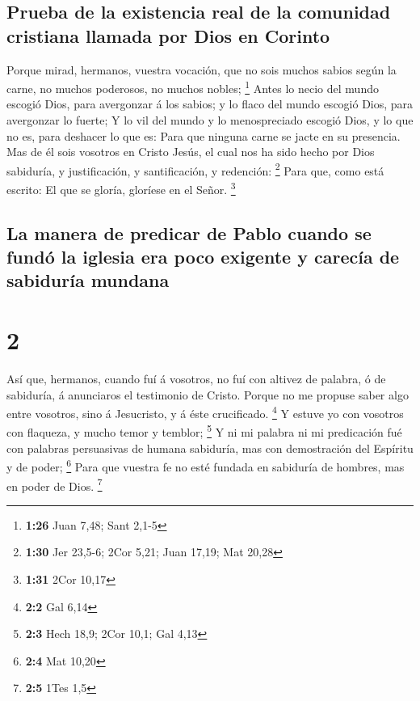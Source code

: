 \hypertarget{prueba-de-la-existencia-real-de-la-comunidad-cristiana-llamada-por-dios-en-corinto}{%
\subsection{Prueba de la existencia real de la comunidad cristiana
llamada por Dios en
Corinto}\label{prueba-de-la-existencia-real-de-la-comunidad-cristiana-llamada-por-dios-en-corinto}}

 Porque mirad, hermanos, vuestra vocación, que no sois
muchos sabios según la carne, no muchos poderosos, no muchos nobles;
\footnote{\textbf{1:26} Juan 7,48; Sant 2,1-5}  Antes lo
necio del mundo escogió Dios, para avergonzar á los sabios; y lo flaco
del mundo escogió Dios, para avergonzar lo fuerte;  Y lo
vil del mundo y lo menospreciado escogió Dios, y lo que no es, para
deshacer lo que es:  Para que ninguna carne se jacte en
su presencia.  Mas de él sois vosotros en Cristo Jesús,
el cual nos ha sido hecho por Dios sabiduría, y justificación, y
santificación, y redención: \footnote{\textbf{1:30} Jer 23,5-6; 2Cor
  5,21; Juan 17,19; Mat 20,28}  Para que, como está
escrito: El que se gloría, gloríese en el Señor. \footnote{\textbf{1:31}
  2Cor 10,17}

\hypertarget{la-manera-de-predicar-de-pablo-cuando-se-funduxf3-la-iglesia-era-poco-exigente-y-carecuxeda-de-sabiduruxeda-mundana}{%
\subsection{La manera de predicar de Pablo cuando se fundó la iglesia
era poco exigente y carecía de sabiduría
mundana}\label{la-manera-de-predicar-de-pablo-cuando-se-funduxf3-la-iglesia-era-poco-exigente-y-carecuxeda-de-sabiduruxeda-mundana}}

\hypertarget{section-1}{%
\section{2}\label{section-1}}

 Así que, hermanos, cuando fuí á vosotros, no fuí con
altivez de palabra, ó de sabiduría, á anunciaros el testimonio de
Cristo.  Porque no me propuse saber algo entre vosotros,
sino á Jesucristo, y á éste crucificado. \footnote{\textbf{2:2} Gal 6,14}
 Y estuve yo con vosotros con flaqueza, y mucho temor y
temblor; \footnote{\textbf{2:3} Hech 18,9; 2Cor 10,1; Gal 4,13}
 Y ni mi palabra ni mi predicación fué con palabras
persuasivas de humana sabiduría, mas con demostración del Espíritu y de
poder; \footnote{\textbf{2:4} Mat 10,20}  Para que vuestra
fe no esté fundada en sabiduría de hombres, mas en poder de Dios.
\footnote{\textbf{2:5} 1Tes 1,5}

